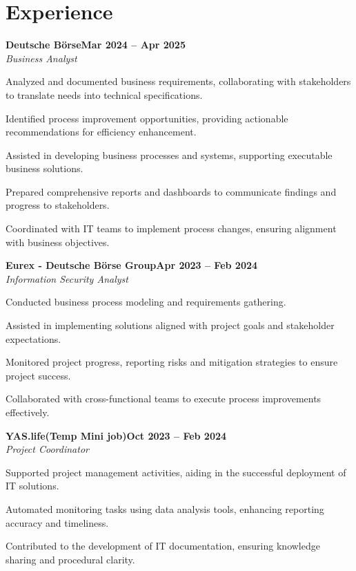 \documentclass[letterpaper,10pt]{article}
\newcommand{\heading}[2]{
  \hspace{10pt}#1\hfill#2\\
}
\newcommand{\headingBf}[2]{
  \heading{\textbf{#1}}{\textbf{#2}}
}
\newcommand{\headingIt}[2]{
  \heading{\textit{#1}}{\textit{#2}}
}
\newenvironment{resume_list}{
  \vspace{-7pt}
  \begin{itemize}[itemsep=-2px, parsep=1pt, leftmargin=20pt, labelsep=10pt]
}{
  \end{itemize}
}
\begin{document}
\section{Experience}

\headingBf{Deutsche Börse}{Mar 2024 -- Apr 2025}
\headingIt{Business Analyst}{}
\begin{resume_list}
  \item Analyzed and documented business requirements, collaborating with stakeholders to translate needs into technical specifications.
  \item Identified process improvement opportunities, providing actionable recommendations for efficiency enhancement.
  \item Assisted in developing business processes and systems, supporting executable business solutions.
  \item Prepared comprehensive reports and dashboards to communicate findings and progress to stakeholders.
  \item Coordinated with IT teams to implement process changes, ensuring alignment with business objectives.
\end{resume_list}

\vspace{-0.5em}
\headingBf{Eurex - Deutsche Börse Group}{Apr 2023 -- Feb 2024}
\headingIt{Information Security Analyst}{}
\begin{resume_list}
  \item Conducted business process modeling and requirements gathering.
  \item Assisted in implementing solutions aligned with project goals and stakeholder expectations.
  \item Monitored project progress, reporting risks and mitigation strategies to ensure project success.
  \item Collaborated with cross-functional teams to execute process improvements effectively.
\end{resume_list}

\vspace{-0.5em}
\headingBf{YAS.life(Temp Mini job)}{Oct 2023 -- Feb 2024}
\headingIt{Project Coordinator}{}
\begin{resume_list}
  \item Supported project management activities, aiding in the successful deployment of IT solutions.
  \item Automated monitoring tasks using data analysis tools, enhancing reporting accuracy and timeliness.
  \item Contributed to the development of IT documentation, ensuring knowledge sharing and procedural clarity.
\end{resume_list}
\end{document}
